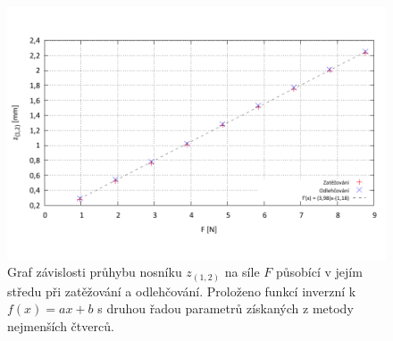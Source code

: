 \documentclass[english]{article}
\begin{document}
		\begin{figure}[h!]
		\begin{center}
		\vspace*{-1.5cm}
		    \includegraphics[width=\linewidth]{../gnuplot/data_f2.pdf}
		    \vspace*{-1.5cm}
		    	\caption{Graf závislosti průhybu nosníku $z_{(1,2)}$ na síle $F$ působící v jejím středu při zatěžování a odlehčování. Proloženo funkcí inverzní k $f(x) = ax+b$ s druhou řadou parametrů získaných z metody nejmenších čtverců.}
				\label{fig:f_2}
		\end{center}
		\end{figure}
\end{document}
